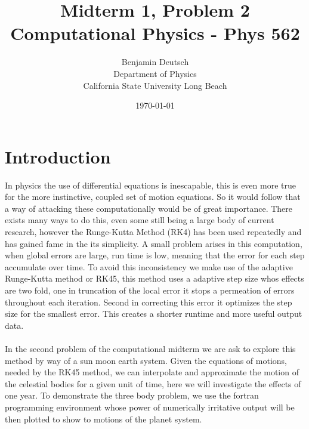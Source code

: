 \documentclass[12pt,letterpaper,notitlepage]{article}
\begin{document}


\title{%
	Midterm 1, Problem 2  \\
\large Computational Physics - Phys 562}
\author{Benjamin Deutsch  \\
Department of Physics\\
California State University Long Beach}
\date{\today }

  
\maketitle



\begin{abstract}     
\end{abstract}

\section{Introduction}

In physics the use of differential equations is inescapable, this is even more true for the more instinctive, coupled set of motion equations. So it would follow that a way of attacking these computationally would be of great importance. There exists many ways to do this, even some still being a large body of current research, however the Runge-Kutta Method (RK4) has been used repeatedly and has gained fame in the its simplicity. A small problem arises in this computation, when global errors are large, run time is low, meaning that the error for each step accumulate over time. To avoid this inconsistency we make use of the adaptive Runge-Kutta method or RK45, this method uses a adaptive step size whos effects are two fold, one in truncation of the local error it stops a permeation of errors throughout each iteration. Second in correcting this error it optimizes the step size for the smallest error. This creates a shorter runtime and more useful output data. 
\\
\\
In the second problem of the computational midterm we are ask to explore this method by way of a sun moon earth system. Given the equations of motions, needed by the RK45 method, we can interpolate and approximate the motion of the celestial bodies for a given unit of time, here we will investigate the effects of one year. To demonstrate the three body problem, we use the fortran programming environment whose power of numerically irritative output will be then plotted to show to motions of the planet system.     
\end{document}
